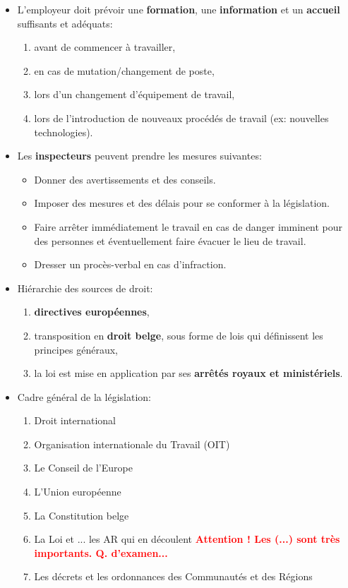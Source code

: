 \documentclass[a4paper]{article}
\begin{document}
\begin{itemize}
\item L'employeur doit prévoir une \textbf{formation}, une \textbf{information} et un \textbf{accueil} suffisants et adéquats:
\begin{enumerate}
    \item avant de commencer à travailler,
    \item en cas de mutation/changement de poste,
    \item lors d'un changement d'équipement de travail,
    \item lors de l’introduction de nouveaux procédés de travail (ex: nouvelles technologies).
\end{enumerate}





\item Les \textbf{inspecteurs} peuvent prendre les mesures suivantes:
\begin{itemize}
    \item Donner des avertissements et des conseils.
    \item Imposer des mesures et des délais pour se conformer à la législation.
    \item Faire arrêter immédiatement le travail en cas de danger imminent pour des personnes et éventuellement faire évacuer le lieu de travail.
    \item Dresser un procès-verbal en cas d’infraction.
\end{itemize}





\item Hiérarchie des sources de droit:
\begin{enumerate}
    \item \textbf{directives européennes},
    \item transposition en \textbf{droit belge}, sous forme de lois qui définissent les principes généraux,
    \item la loi est mise en application par ses \textbf{arrêtés royaux et ministériels}.
\end{enumerate}





\item Cadre général de la législation:
\begin{enumerate}
    \item Droit international
    \item Organisation internationale du Travail (OIT)
    \item Le Conseil de l’Europe
    \item L’Union européenne
    \item La Constitution belge
    \item La Loi et ... les AR qui en découlent \textcolor{red}{\textbf{Attention ! Les (...) sont très importants. Q. d'examen...}}
    \item Les décrets et les ordonnances des Communautés et des Régions
\end{enumerate}






\end{itemize}
\end{document}
